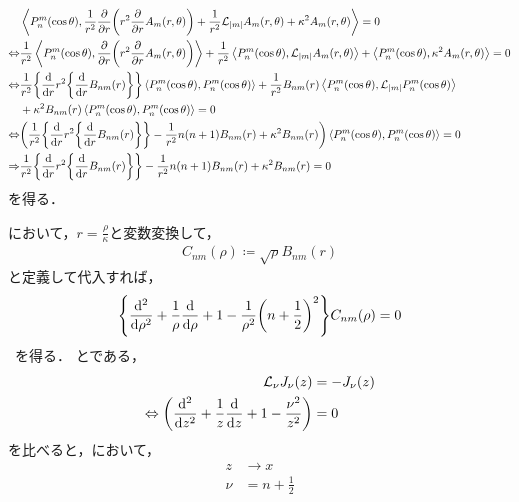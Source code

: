 \documentclass{report}
\begin{document}
    \begin{align}
      & \left\langle P_n^{m}(\cos\theta), \frac{1}{r^2}\pdv{r}\qty(r^2\pdv{r}A_m(r, \theta)) + \frac{1}{r^2}\mathcal{L}_{\abs{m}}A_m(r, \theta) + \kappa^2 A_m(r, \theta) \right\rangle = 0 \\ 
      \Leftrightarrow & \frac{1}{r^2}\left\langle P_n^{m}(\cos\theta), \pdv{r}\qty(r^2\pdv{r}A_m(r, \theta)) \right\rangle + \frac{1}{r^2}\left\langle P_n^{m}(\cos\theta), \mathcal{L}_{\abs{m}}A_m(r, \theta) \right\rangle + \left\langle P_n^{m}(\cos\theta), \kappa^2 A_m(r, \theta) \right\rangle = 0 \\ 
      \Leftrightarrow & \frac{1}{r^2}\qty{\dv{r}r^2\qty{\dv{r}B_{nm}(r)}}\left\langle P_n^{m}(\cos\theta), P_n^{m}(\cos\theta) \right\rangle + \frac{1}{r^2}B_{nm}(r)\left\langle P_n^{m}(\cos\theta), \mathcal{L}_{\abs{m}}P_n^{m}(\cos\theta) \right\rangle \notag \\ 
      &+ \kappa^2B_{nm}(r)\left\langle P_n^{m}(\cos\theta), P_n^{m}(\cos\theta) \right\rangle = 0 \\ 
      \Leftrightarrow&  \qty(\frac{1}{r^2}\qty{\dv{r}r^2\qty{\dv{r}B_{nm}(r)}} - \frac{1}{r^2}n(n + 1)B_{nm}(r) + \kappa^2 B_{nm}(r))\left\langle P_n^{m}(\cos\theta), P_n^{m}(\cos\theta) \right\rangle = 0 \\ 
      \Rightarrow& \frac{1}{r^2}\qty{\dv{r}r^2\qty{\dv{r}B_{nm}(r)}} - \frac{1}{r^2}n(n + 1)B_{nm}(r) + \kappa^2 B_{nm}(r) = 0\label{bnm-condition}
    \end{align}
    を得る．
    \par
    において，$r = \frac{\rho}{\kappa}$と変数変換して，
    \begin{align}
      C_{nm}(\rho) \coloneq \sqrt{\rho}B_{nm}(r)
    \end{align}
    と定義して代入すれば，
    \begin{align}
      \qty{\dv[2]{\rho} + \frac{1}{\rho}\dv{\rho} + 1 - \frac{1}{\rho^2}\qty(n + \frac{1}{2})^2}C_{nm}(\rho) = 0\label{bessel-form-rho}
    \end{align}\
    を得る．
    とである，
    \begin{align}
      \mathcal{L}_{\nu}J_{\nu}(z) &= - J_{\nu}(z)  \\ 
      \Leftrightarrow \qty(\dv[2]{z} + \frac{1}{z}\dv{z} + 1 - \frac{\nu^2}{z^2}) &= 0 \label{bessel-differential-eq-sub-2}
    \end{align}
    を比べると，において，
    \begin{align}
      z &\to x \\ 
      \nu &= n + \frac{1}{2}
    \end{align}
\end{document}
